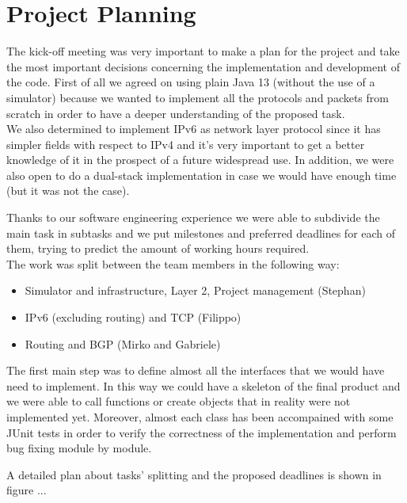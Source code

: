 \chapter{Project Planning}\label{projPlan}

The kick-off meeting was very important to make a plan for the project and take the most important
decisions concerning the implementation and development of the code.
First of all we agreed on using plain Java 13 (without the use of a simulator) because we
wanted to implement all the protocols and packets from scratch in order to have a deeper
understanding of the proposed task.\\
We also determined to implement IPv6 as network layer protocol since it has simpler fields with respect to IPv4 and
it's very important to get a better knowledge of it in the prospect of a future widespread use. In addition, we were
also open to do a dual-stack implementation in case we would have enough time (but it was not the case).

Thanks to our software engineering experience we were able to subdivide the main task in
subtasks and we put milestones and preferred deadlines for each of them, trying to predict
the amount of working hours required.\\
The work was split between the team members in the following way:
\begin{itemize}
    \item Simulator and infrastructure, Layer 2, Project management (Stephan)
    \item IPv6 (excluding routing) and TCP (Filippo)
    \item Routing and BGP (Mirko and Gabriele)
\end{itemize}

The first main step was to define almost all the interfaces that we would have need to implement.
In this way we could have a skeleton of the final product and we were able to call functions
or create objects that in reality were not implemented yet.
Moreover, almost each class has been accompained with some JUnit tests in order to verify
the correctness of the implementation and perform bug fixing module by module.

A detailed plan about tasks' splitting and the proposed deadlines is shown in figure ...


